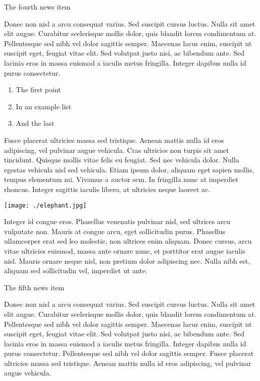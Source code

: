 \documentclass[10pt,a4paper]{article} %
\newcommand{\NewsItem}[1]{ %
\usefont{T1}{fvs}{n}{n} %
\vspace{24pt}\large #1\vspace{3pt} %
\par \normalsize \normalfont}
\begin{document}
\begin{multicols}{3}

\NewsItem{The fourth news item}

Donec non nisl a arcu consequat varius. Sed suscipit cursus luctus. Nulla sit amet elit augue. Curabitur scelerisque mollis dolor, quis blandit lorem condimentum at. Pellentesque sed nibh vel dolor sagittis semper. Maecenas lacus enim, suscipit ut suscipit eget, feugiat vitae elit. Sed volutpat justo nisi, ac bibendum ante. Sed lacinia eros in massa euismod a iaculis metus fringilla. Integer dapibus nulla id purus consectetur.

\begin{enumerate}
\item The first point
\item In an example list
\item And the last
\end{enumerate}

Fusce placerat ultricies massa sed tristique. Aenean mattis nulla id eros adipiscing, vel pulvinar augue vehicula. Cras ultricies non turpis sit amet tincidunt. Quisque mollis vitae felis eu feugiat. Sed nec vehicula dolor. Nulla egestas vehicula nisl sed vehicula. Etiam ipsum dolor, aliquam eget sapien mollis, tempus elementum mi. Vivamus a auctor sem. In fringilla nunc at imperdiet rhoncus. Integer sagittis iaculis libero, at ultricies neque laoreet ac.

\begin{center}
\texttt{[image: ./elephant.jpg]} %
\end{center}

Integer id congue eros. Phasellus venenatis pulvinar nisl, sed ultrices arcu vulputate non. Mauris at congue arcu, eget sollicitudin purus. Phasellus ullamcorper erat sed leo molestie, non ultrices enim aliquam. Donec cursus, arcu vitae ultricies euismod, massa ante ornare nunc, et porttitor erat augue iaculis nisl. Mauris ornare neque nisl, non pretium dolor adipiscing nec. Nulla nibh est, aliquam sed sollicitudin vel, imperdiet ut ante.


\NewsItem{The fifth news item}

Donec non nisl a arcu consequat varius. Sed suscipit cursus luctus. Nulla sit amet elit augue. Curabitur scelerisque mollis dolor, quis blandit lorem condimentum at. Pellentesque sed nibh vel dolor sagittis semper. Maecenas lacus enim, suscipit ut suscipit eget, feugiat vitae elit. Sed volutpat justo nisi, ac bibendum ante. Sed lacinia eros in massa euismod a iaculis metus fringilla. Integer dapibus nulla id purus consectetur. Pellentesque sed nibh vel dolor sagittis semper. Fusce placerat ultricies massa sed tristique. Aenean mattis nulla id eros adipiscing, vel pulvinar augue vehicula.


\end{multicols}
\end{document}
